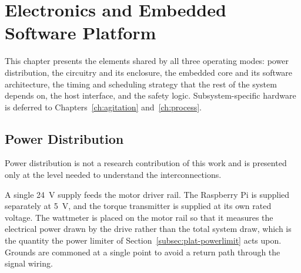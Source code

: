 
\chapter{Electronics and Embedded Software Platform}
\label{ch:platform}

\ifpdf
    \graphicspath{{Chapter4/Figs/Raster/}{Chapter4/Figs/PDF/}{Chapter4/Figs/}}
\else
    \graphicspath{{Chapter4/Figs/Vector/}{Chapter4/Figs/}}
\fi

This chapter presents the elements shared by all three operating modes: power distribution, the circuitry and its enclosure, the embedded core and its software architecture, the timing and scheduling strategy that the rest of the system depends on, the host interface, and the safety logic. Subsystem-specific hardware is deferred to Chapters~\ref{ch:agitation} and~\ref{ch:process}.


\section{Power Distribution}
\label{sec:plat-power}

Power distribution is not a research contribution of this work and is presented only at the level needed to understand the interconnections.


A single 24~V supply feeds the motor driver rail. The Raspberry Pi is supplied separately at 5~V, and the torque transmitter is supplied at its own rated voltage. The wattmeter is placed on the motor rail so that it measures the electrical power drawn by the drive rather than the total system draw, which is the quantity the power limiter of Section~\ref{subsec:plat-powerlimit} acts upon. Grounds are commoned at a single point to avoid a return path through the signal wiring.


